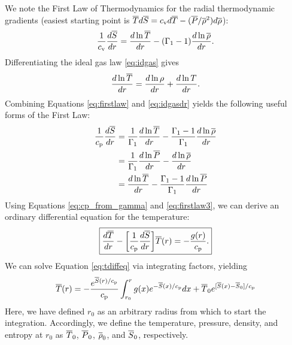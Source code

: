 \documentclass[12pt]{article} %
\begin{document}
	We note the First Law of Thermodynamics for the radial thermodynamic gradients (easiest starting point is $\overline{T} d\overline{S}=c_{\rm{v}} d\overline{T}-(\overline{P}/\overline{\rho}^2)d\overline{\rho}$):
	\begin{align}
	\frac{1}{c_{\rm{v}}}\frac{d\overline{S}}{dr} =\frac{d\ln\overline{T}}{dr} - (\Gamma_1 - 1)\frac{d\ln\overline{\rho}}{dr}.
	\label{eq:firstlaw}
	\end{align}
	Differentiating the ideal gas law \eqref{eq:idgas} gives
	\begin{align}
	\frac{d\ln\overline{T}}{dr} = \frac{d\ln{\rho}}{dr} + \frac{d\ln{T}}{dr}. 
	\label{eq:idgasdr}
	\end{align}
	Combining Equations \eqref{eq:firstlaw} and \eqref{eq:idgasdr} yields the following useful forms of the First Law:
	\begin{subequations}
		\begin{align}
		\frac{1}{c_{\rm{p}}}\frac{d\overline{S}}{dr} &=\frac{1}{\Gamma_1}\frac{d\ln\overline{T}}{dr} - \frac{\Gamma_1 - 1}{\Gamma_1}\frac{d\ln\overline{\rho}}{dr}\label{eq:firstlawtmprho}\\
		&=\frac{1}{\Gamma_1}\frac{d\ln\overline{P}}{dr} - \frac{d\ln\overline{\rho}}{dr}\label{eq:firstlawprsrho}\\
		&= \frac{d\ln\overline{T}}{dr} - \frac{\Gamma_1 - 1}{\Gamma_1}\frac{d\ln\overline{P}}{dr}\label{eq:firstlawtmpprs}
		\end{align}
		\label{eq:firstlaw3}
	\end{subequations}
	Using Equations \eqref{eq:cp_from_gamma} and \eqref{eq:firstlaw3}, we can derive an ordinary differential equation for the temperature:
	\begin{align}
	\boxed{
	\frac{d\overline{T}}{dr} - \bigg{[}\frac{1}{c_{\rm{p}}}\frac{d\overline{S}}{dr}\bigg{]}\overline{T}(r) = -\frac{g(r)}{c_{\rm{p}}}.
}
\label{eq:tdiffeq}
	\end{align}
	We can solve Equation \eqref{eq:tdiffeq} via integrating factors, yielding 
	\begin{align}
	\overline{T}(r) = -\frac{e^{\overline{S}(r)/c_{\rm{p}}}}{c_{\rm{p}}}\int_{r_0}^r g(x)e^{-\overline{S}(x)/c_{\rm{p}}}dx + \overline{T}_0e^{[\overline{S}(x)-\overline{S}_0]/c_{\rm{p}}}
	\label{eq:tgeneral1}
	\end{align}
	Here, we have defined $r_0$ as an arbitrary radius from which to start the integration. Accordingly, we define the temperature, pressure, density, and entropy at $r_0$ as $\overline{T}_0$, $\overline{P}_0$, $\overline{\rho}_0$, and $\overline{S}_0$, respectively.
	
\end{document}
